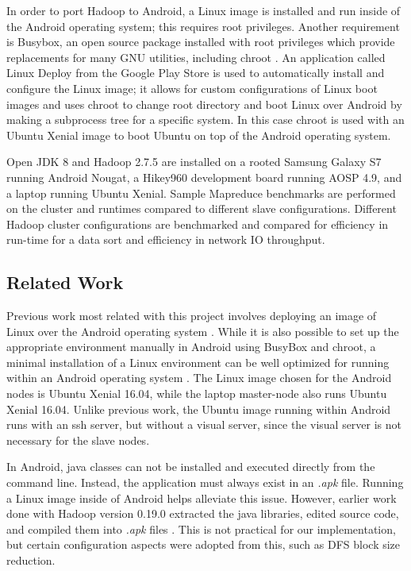 \documentclass[10pt,journal,compsoc,float]{IEEEtran}
\begin{document}
In order to port Hadoop to Android, a Linux image is installed and run inside of the Android operating system; this requires root privileges. Another requirement is Busybox, an open source package installed with root privileges which provide replacements for many GNU utilities, including chroot \cite{Busybox}. An application called Linux Deploy \cite{LinuxDeploy} from the Google Play Store is used to automatically install and configure the Linux image; it allows for custom configurations of Linux boot images and uses chroot to change root directory and boot Linux over Android by making a subprocess tree for a specific system. In this case chroot is used with an Ubuntu Xenial image to boot Ubuntu on top of the Android operating system.

Open JDK 8 and Hadoop 2.7.5 are installed on a rooted Samsung Galaxy S7 running Android Nougat, a Hikey960 development board running AOSP 4.9, and a laptop running Ubuntu Xenial. Sample Mapreduce benchmarks are performed on the cluster and runtimes compared to different slave configurations. Different Hadoop cluster configurations are benchmarked and compared for efficiency in run-time for a data sort and efficiency in network IO throughput.

\subsection{Related Work}
\label{sec:relatedwork}
Previous work most related with this project involves deploying an image of Linux over the Android operating system \cite{Bothe} \cite{Tambe}. While it is also possible to set up the appropriate environment manually in Android using BusyBox and chroot, a minimal installation of a Linux environment can be well optimized for running within an Android operating system \cite{LinuxDeploy}. The Linux image chosen for the Android nodes is Ubuntu Xenial 16.04, while the laptop master-node also runs Ubuntu Xenial 16.04. Unlike previous work, the Ubuntu image running within Android runs with an ssh server, but without a visual server, since the visual server is not necessary for the slave nodes.

In Android, java classes can not be installed and executed directly from the command line. Instead, the application must always exist in an \textit{.apk} file. Running a Linux image inside of Android helps alleviate this issue. However, earlier work done with Hadoop version 0.19.0 extracted the java libraries, edited source code, and compiled them into \textit{.apk} files \cite{Marinelli}. This is not practical for our implementation, but certain configuration aspects were adopted from this, such as DFS block size reduction.
\end{document}
